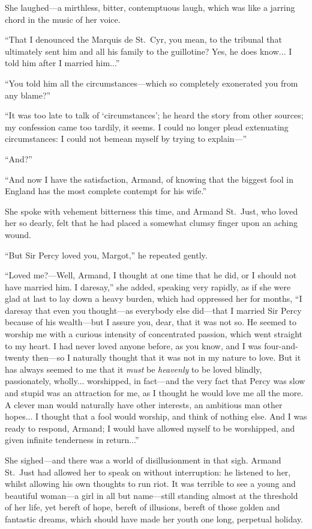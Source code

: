 \documentclass[paper=5.5in:8.5in,BCOR=7mm,twoside,DIV=calc,12pt,usegeometry,chapterprefix,endperiod,headings=big]{scrbook}
\begin{document}
She laughed---a mirthless, bitter, contemptuous laugh, which was like a jarring chord in the music of her voice.

\enquote{That I denounced the Marquis de St.~Cyr, you mean, to the tribunal that ultimately sent him and all his family to the guillotine? Yes, he does know... I told him after I married him...}

\enquote{You told him all the circumstances---which so completely exonerated you from any blame?}

\enquote{It was too late to talk of \enquote{circumstances}; he heard the story from other sources; my confession came too tardily, it seems. I could no longer plead extenuating circumstances: I could not bemean myself by trying to explain---}

\enquote{And?}

\enquote{And now I have the satisfaction, Armand, of knowing that the biggest fool in England has the most complete contempt for his wife.}

She spoke with vehement bitterness this time, and Armand St.~Just, who loved her so dearly, felt that he had placed a somewhat clumsy finger upon an aching wound.

\enquote{But Sir Percy loved you, Margot,} he repeated gently.

\enquote{Loved me?---Well, Armand, I thought at one time that he did, or I should not have married him. I daresay,} she added, speaking very rapidly, as if she were glad at last to lay down a heavy burden, which had oppressed her for months, \enquote{I daresay that even you thought---as everybody else did---that I married Sir Percy because of his wealth---but I assure you, dear, that it was not so. He seemed to worship me with a curious intensity of concentrated passion, which went straight to my heart. I had never loved anyone before, as you know, and I was four-and-twenty then---so I naturally thought that it was not in my nature to love. But it has always seemed to me that it \textit{must} be \textit{heavenly} to be loved blindly, passionately, wholly... worshipped, in fact---and the very fact that Percy was slow and stupid was an attraction for me, as I thought he would love me all the more. A clever man would naturally have other interests, an ambitious man other hopes... I thought that a fool would worship, and think of nothing else. And I was ready to respond, Armand; I would have allowed myself to be worshipped, and given infinite tenderness in return...}

She sighed---and there was a world of disillusionment in that sigh. Armand St.~Just had allowed her to speak on without interruption: he listened to her, whilst allowing his own thoughts to run riot. It was terrible to see a young and beautiful woman---a girl in all but name---still standing almost at the threshold of her life, yet bereft of hope, bereft of illusions, bereft of those golden and fantastic dreams, which should have made her youth one long, perpetual holiday.
\end{document}
